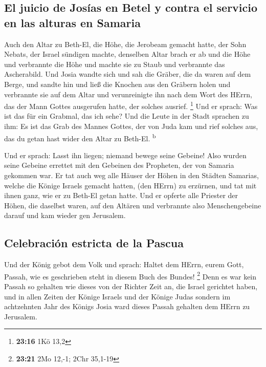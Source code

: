 \hypertarget{el-juicio-de-josuxedas-en-betel-y-contra-el-servicio-en-las-alturas-en-samaria}{%
\subsection{El juicio de Josías en Betel y contra el servicio en las
alturas en
Samaria}\label{el-juicio-de-josuxedas-en-betel-y-contra-el-servicio-en-las-alturas-en-samaria}}

 Auch den Altar zu Beth-El, die Höhe, die Jerobeam
gemacht hatte, der Sohn Nebats, der Israel sündigen machte, denselben
Altar brach er ab und die Höhe und verbrannte die Höhe und machte sie zu
Staub und verbrannte das Ascherabild.  Und Josia wandte
sich und sah die Gräber, die da waren auf dem Berge, und sandte hin und
ließ die Knochen aus den Gräbern holen und verbrannte sie auf dem Altar
und verunreinigte ihn nach dem Wort des HErrn, das der Mann Gottes
ausgerufen hatte, der solches ausrief. \footnote{\textbf{23:16} 1Kö 13,2}
 Und er sprach: Was ist das für ein Grabmal, das ich
sehe? Und die Leute in der Stadt sprachen zu ihm: Es ist das Grab des
Mannes Gottes, der von Juda kam und rief solches aus, das du getan hast
wider den Altar zu Beth-El. \textsuperscript{b}

 Und er sprach: Lasst ihn liegen; niemand bewege seine
Gebeine! Also wurden seine Gebeine errettet mit den Gebeinen des
Propheten, der von Samaria gekommen war.  Er tat auch weg
alle Häuser der Höhen in den Städten Samarias, welche die Könige Israels
gemacht hatten, (den HErrn) zu erzürnen, und tat mit ihnen ganz, wie er
zu Beth-El getan hatte.  Und er opferte alle Priester der
Höhen, die daselbst waren, auf den Altären und verbrannte also
Menschengebeine darauf und kam wieder gen Jerusalem.

\hypertarget{celebraciuxf3n-estricta-de-la-pascua}{%
\subsection{Celebración estricta de la
Pascua}\label{celebraciuxf3n-estricta-de-la-pascua}}

 Und der König gebot dem Volk und sprach: Haltet dem
HErrn, eurem Gott, Passah, wie es geschrieben steht in diesem Buch des
Bundes! \footnote{\textbf{23:21} 2Mo 12,-1; 2Chr 35,1-19}
 Denn es war kein Passah so gehalten wie dieses von der
Richter Zeit an, die Israel gerichtet haben, und in allen Zeiten der
Könige Israels und der Könige Judas  sondern im
achtzehnten Jahr des Königs Josia ward dieses Passah gehalten dem HErrn
zu Jerusalem.

